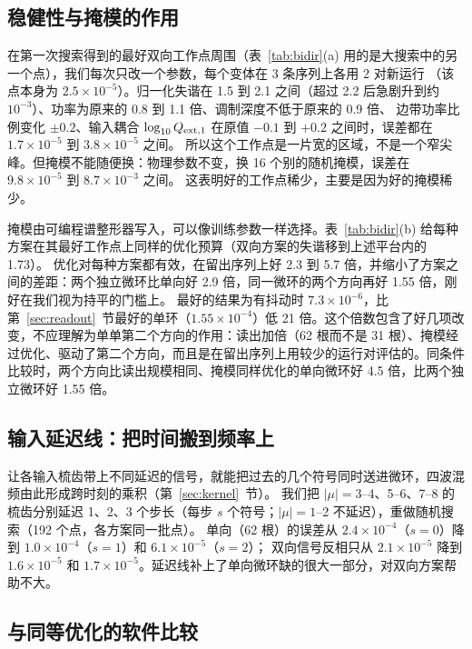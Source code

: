 \subsection{稳健性与掩模的作用}

在第一次搜索得到的最好双向工作点周围（表~\ref{tab:bidir}(a) 用的是大搜索中的另一个点），我们每次只改一个参数，每个变体在 3 条序列上各用 2 对新运行
（该点本身为 $2.5\times10^{-5}$）。归一化失谐在 1.5 到 2.1 之间（超过 2.2 后急剧升到约 $10^{-3}$）、功率为原来的 0.8 到 1.1 倍、调制深度不低于原来的 0.9 倍、
边带功率比例变化 $\pm0.2$、输入耦合 $\log_{10}Q_{\mathrm{ext},1}$ 在原值 $-0.1$ 到 $+0.2$ 之间时，误差都在 $1.7\times10^{-5}$ 到 $3.8\times10^{-5}$ 之间。
所以这个工作点是一片宽的区域，不是一个窄尖峰。但掩模不能随便换：物理参数不变，换 16 个别的随机掩模，误差在 $9.8\times10^{-5}$ 到 $8.7\times10^{-3}$ 之间。
这表明好的工作点稀少，主要是因为好的掩模稀少。

掩模由可编程谱整形器写入，可以像训练参数一样选择。表~\ref{tab:bidir}(b) 给每种方案在其最好工作点上同样的优化预算（双向方案的失谐移到上述平台内的 1.73）。
优化对每种方案都有效，在留出序列上好 2.3 到 5.7 倍，并缩小了方案之间的差距：两个独立微环比单向好 2.9 倍，同一微环的两个方向再好 1.55 倍，刚好在我们视为持平的门槛上。
最好的结果为有抖动时 $7.3\times10^{-6}$，比第~\ref{sec:readout}~节最好的单环（$1.55\times10^{-4}$）低 21 倍。这个倍数包含了好几项改变，不应理解为单单第二个方向的作用：读出加倍（62 根而不是 31 根）、掩模经过优化、驱动了第二个方向，而且是在留出序列上用较少的运行对评估的。同条件比较时，两个方向比读出规模相同、掩模同样优化的单向微环好 4.5 倍，比两个独立微环好 1.55 倍。

\subsection{输入延迟线：把时间搬到频率上}

让各输入梳齿带上不同延迟的信号，就能把过去的几个符号同时送进微环，四波混频由此形成跨时刻的乘积（第~\ref{sec:kernel}~节）。
我们把 $|\mu|=3$--4、5--6、7--8 的梳齿分别延迟 1、2、3 个步长（每步 $s$ 个符号；$|\mu|=1$--2 不延迟），重做随机搜索（192 个点，各方案同一批点）。
单向（62 根）的误差从 $2.4\times10^{-4}$（$s=0$）降到 $1.0\times10^{-4}$（$s=1$）和 $6.1\times10^{-5}$（$s=2$）；
双向信号反相只从 $2.1\times10^{-5}$ 降到 $1.6\times10^{-5}$ 和 $1.7\times10^{-5}$。延迟线补上了单向微环缺的很大一部分，对双向方案帮助不大。

\subsection{与同等优化的软件比较}\label{sec:bidir-software}

